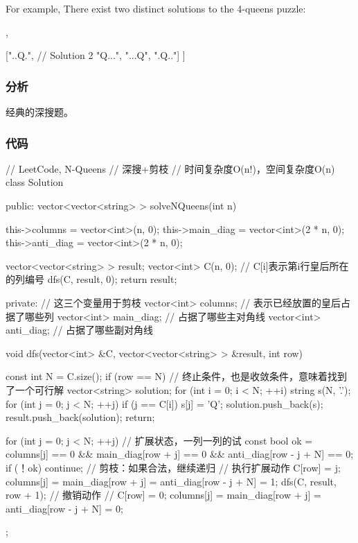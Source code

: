 For example,
There exist two distinct solutions to the 4-queens puzzle:
\begin{Code}
[
 [".Q..",  // Solution 1
  "...Q",
  "Q...",
  "..Q."],

 ["..Q.",  // Solution 2
  "Q...",
  "...Q",
  ".Q.."]
]
\end{Code}


\subsubsection{分析}
经典的深搜题。

\subsubsection{代码}
\begin{Code}
// LeetCode, N-Queens
// 深搜+剪枝
// 时间复杂度O(n!)，空间复杂度O(n)
class Solution {
public:
    vector<vector<string> > solveNQueens(int n) {
        this->columns = vector<int>(n, 0);
        this->main_diag = vector<int>(2 * n, 0);
        this->anti_diag = vector<int>(2 * n, 0);

        vector<vector<string> > result;
        vector<int> C(n, 0);  // C[i]表示第i行皇后所在的列编号
        dfs(C, result, 0);
        return result;
    }
private:
    // 这三个变量用于剪枝
    vector<int> columns;  // 表示已经放置的皇后占据了哪些列
    vector<int> main_diag;  // 占据了哪些主对角线
    vector<int> anti_diag;  // 占据了哪些副对角线

    void dfs(vector<int> &C, vector<vector<string> > &result, int row) {
        const int N = C.size();
        if (row == N) { // 终止条件，也是收敛条件，意味着找到了一个可行解
            vector<string> solution;
            for (int i = 0; i < N; ++i) {
                string s(N, '.');
                for (int j = 0; j < N; ++j) {
                    if (j == C[i]) s[j] = 'Q';
                }
                solution.push_back(s);
            }
            result.push_back(solution);
            return;
        }

        for (int j = 0; j < N; ++j) {  // 扩展状态，一列一列的试
            const bool ok = columns[j] == 0 && main_diag[row + j] == 0 &&
                    anti_diag[row - j + N] == 0;
            if (！ok) continue;  // 剪枝：如果合法，继续递归
            // 执行扩展动作
            C[row] = j;
            columns[j] = main_diag[row + j] = anti_diag[row - j + N] = 1;
            dfs(C, result, row + 1);
            // 撤销动作
            // C[row] = 0;
            columns[j] = main_diag[row + j] = anti_diag[row - j + N] = 0;
        }
    }
};
\end{Code}

